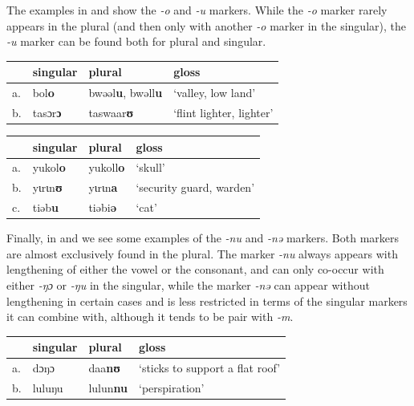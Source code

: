 The examples in  and  show the \textit{-o} and \textit{-u} markers. While the \textit{-o} marker rarely appears in the plural (and then only with another \textit{-o} marker in the singular), the \textit{-u} marker can be found both for plural and singular.

\begin{exe}
    \ex \label{osg-kasem}
    \begin{tabular}[t]{llll}
      & singular        & plural                           & gloss                    \\
      \midrule
      a. & bol\textbf{o}   & bwəəl\textbf{u}, bwəll\textbf{u} & `valley, low land'       \\
      b. & tasɔr\textbf{ɔ} & taswaar\textbf{ʊ}                & `flint lighter, lighter' \\
    \end{tabular}
\end{exe}

\begin{exe}
    \ex \label{opl-kasem}
    \begin{tabular}[t]{llll}
      & singular & plural  & gloss                    \\
      \midrule
      a. & yukol\textbf{o}   & yukoll\textbf{o} & `skull'                  \\
      b. & yɩrɩn\textbf{ʊ}   & yɩrɩn\textbf{a}  & `security guard, warden' \\
      c. & tiəb\textbf{u}    & tiəbi\textbf{ə}  & `cat'                    \\
    \end{tabular}
\end{exe}

Finally, in  and  we see some examples of the \textit{-nu} and \textit{-nə} markers. Both markers are almost exclusively found in the plural. The marker \textit{-nu} always appears with lengthening of either the vowel or the consonant,
and can only co-occur with either \textit{-ŋɔ} or \textit{-ŋu} in the singular, while the marker \textit{-nə} can appear without lengthening in certain cases and is less restricted in terms of the singular markers it can combine with, although it tends to be pair with \textit{-m}.

\begin{exe}
    \ex \label{nupl-kasem}
    \begin{tabular}[t]{llll}
      & singular & plural  & gloss                           \\
      \midrule
      a. & dɔŋɔ     & daa\textbf{nʊ}   & `sticks to support a flat roof' \\
      b. & luluŋu   & lulun\textbf{nu} & `perspiration'                  \\
    \end{tabular}
\end{exe}

